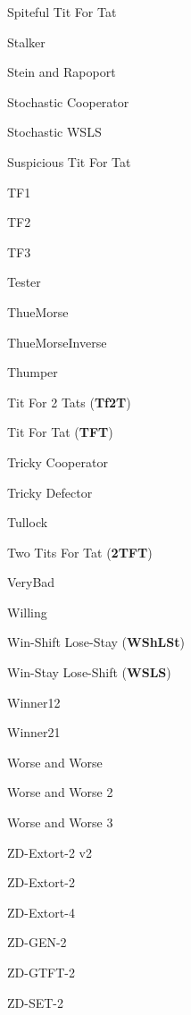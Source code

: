 \item Spiteful Tit For Tat~\cite{prison}
\item Stalker~\cite{Carvalho2013}
\item Stein and Rapoport~\cite{Axelrod1980a}
\item Stochastic Cooperator~\cite{Adami2013}
\item Stochastic WSLS~\cite{axelrodproject}
\item Suspicious Tit For Tat~\cite{Beaufils1997, Hilbe2013}
\item TF1~\cite{axelrodproject}
\item TF2~\cite{axelrodproject}
\item TF3~\cite{axelrodproject}
\item Tester~\cite{Axelrod1980b}
\item ThueMorse~\cite{axelrodproject}
\item ThueMorseInverse~\cite{axelrodproject}
\item Thumper~\cite{Ashlock2008}
\item Tit For 2 Tats (\textbf{Tf2T})~\cite{Axelrod1981}
\item Tit For Tat (\textbf{TFT})~\cite{Axelrod1980a}
\item Tricky Cooperator~\cite{axelrodproject}
\item Tricky Defector~\cite{axelrodproject}
\item Tullock~\cite{Axelrod1980a}
\item Two Tits For Tat (\textbf{2TFT})~\cite{Axelrod1981}
\item VeryBad~\cite{Andre2013}
\item Willing \cite{Van2015}
\item Win-Shift Lose-Stay (\textbf{WShLSt})~\cite{Li2011}
\item Win-Stay Lose-Shift (\textbf{WSLS})~\cite{Kraines1989, Nowak1993, Stewart2012}
\item Winner12~\cite{mathieu2017}
\item Winner21~\cite{mathieu2017}
\item Worse and Worse\cite{prison}
\item Worse and Worse 2\cite{prison}
\item Worse and Worse 3\cite{prison}
\item ZD-Extort-2 v2~\cite{Kuhn2017}
\item ZD-Extort-2~\cite{Stewart2012}
\item ZD-Extort-4~\cite{axelrodproject}
\item ZD-GEN-2~\cite{Kuhn2017}
\item ZD-GTFT-2~\cite{Stewart2012}
\item ZD-SET-2~\cite{Kuhn2017}
